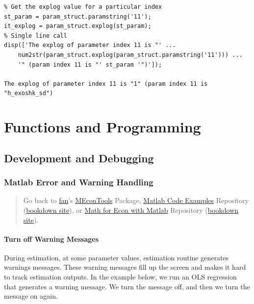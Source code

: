 \documentclass[
]{book}
\begin{document}
\begin{verbatim}
% Get the explog value for a particular index
st_param = param_struct.paramstring('11');
it_explog = param_struct.explog(st_param);
% Single line call
disp(['The explog of parameter index 11 is "' ...
    num2str(param_struct.explog(param_struct.paramstring('11'))) ...
    '" (param index 11 is "' st_param '")']);

The explog of parameter index 11 is "1" (param index 11 is "h_exoshk_sd")
\end{verbatim}

\hypertarget{functions-and-programming}{%
\chapter{Functions and Programming}\label{functions-and-programming}}

\hypertarget{development-and-debugging}{%
\section{Development and Debugging}\label{development-and-debugging}}

\hypertarget{matlab-error-and-warning-handling}{%
\subsection{Matlab Error and Warning Handling}\label{matlab-error-and-warning-handling}}

\begin{quote}
Go back to \href{http://fanwangecon.github.io/}{fan}'s \href{https://fanwangecon.github.io/MEconTools/}{MEconTools} Package, \href{https://fanwangecon.github.io/M4Econ/}{Matlab Code Examples} Repository (\href{https://fanwangecon.github.io/M4Econ/bookdown}{bookdown site}), or \href{https://fanwangecon.github.io/Math4Econ/}{Math for Econ with Matlab} Repository (\href{https://fanwangecon.github.io/Math4Econ/bookdown}{bookdown site}).
\end{quote}

\hypertarget{turn-off-warning-messages}{%
\subsubsection{Turn off Warning Messages}\label{turn-off-warning-messages}}

During estimation, at some parameter values, estimation routine
generates warnings messages. These warning messages fill up the screen
and makes it hard to track estimation outputs. In the example below, we
run an OLS regression that generates a warning message. We turn the
message off, and then we turn the message on again.
\end{document}
